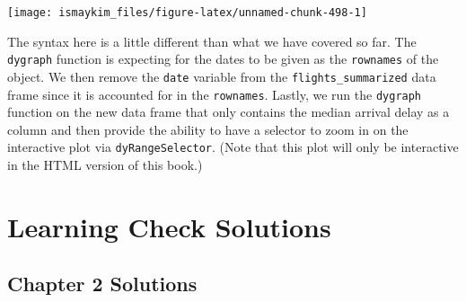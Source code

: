 \documentclass[12pt, krantz2,]{krantz}
\makeatletter
\newenvironment{Shaded}{\begin{snugshade}}{\end{snugshade}}
\newcommand{\DataTypeTok}[1]{\textcolor[rgb]{0.27,0.27,0.27}{#1}}
\newcommand{\KeywordTok}[1]{\textcolor[rgb]{0.27,0.27,0.27}{\textbf{#1}}}
\newcommand{\NormalTok}[1]{#1}
\newcommand{\OperatorTok}[1]{\textcolor[rgb]{0.43,0.43,0.43}{\textbf{#1}}}
\newcommand{\OtherTok}[1]{\textcolor[rgb]{0.37,0.37,0.37}{#1}}
\newcommand{\StringTok}[1]{\textcolor[rgb]{0.5,0.5,0.5}{#1}}
\newenvironment{kframe}{%
\medskip{}
\setlength{\fboxsep}{.8em}
 \def\at@end@of@kframe{}%
 \ifinner\ifhmode%
  \def\at@end@of@kframe{\end{minipage}}%
  \begin{minipage}{\columnwidth}%
 \fi\fi%
 \def\FrameCommand##1{\hskip\@totalleftmargin \hskip-\fboxsep
 \colorbox{shadecolor}{##1}\hskip-\fboxsep
     \hskip-\linewidth \hskip-\@totalleftmargin \hskip\columnwidth}%
 \MakeFramed {\advance\hsize-\width
   \@totalleftmargin\z@ \linewidth\hsize
   \@setminipage}}%
 {\par\unskip\endMakeFramed%
 \at@end@of@kframe}
\renewenvironment{Shaded}{\begin{kframe}}{\end{kframe}}
\makeatother
\begin{document}
\begin{Shaded}
\end{Shaded}

\begin{center}\texttt{[image: ismaykim\_files/figure-latex/unnamed-chunk-498-1]} \end{center}

The syntax here is a little different than what we have covered so far. The \texttt{dygraph} function is expecting for the dates to be given as the \texttt{rownames} of the object. We then remove the \texttt{date} variable from the \texttt{flights\_summarized} data frame since it is accounted for in the \texttt{rownames}. Lastly, we run the \texttt{dygraph} function on the new data frame that only contains the median arrival delay as a column and then provide the ability to have a selector to zoom in on the interactive plot via \texttt{dyRangeSelector}. (Note that this plot will only be interactive in the HTML version of this book.)

\hypertarget{appendixD}{%
\chapter{Learning Check Solutions}\label{appendixD}}

\hypertarget{chapter-2-solutions}{%
\section{Chapter 2 Solutions}\label{chapter-2-solutions}}
\end{document}
